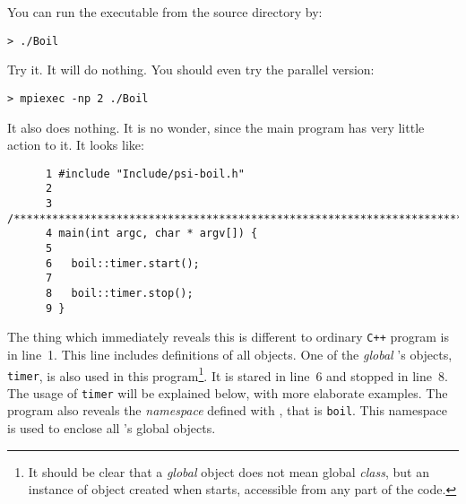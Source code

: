 You can run the executable from the source directory by:
%
\begin{verbatim}
> ./Boil
\end{verbatim} 
%
Try it. It will do nothing. You should even try the parallel version:
%
\begin{verbatim}
> mpiexec -np 2 ./Boil
\end{verbatim} 
%
It also does nothing. It is no wonder, since the main program has very little action
to it. It looks like:
%
{\small \begin{verbatim}
      1 #include "Include/psi-boil.h"
      2
      3 /****************************************************************************/
      4 main(int argc, char * argv[]) {
      5
      6   boil::timer.start();
      7
      8   boil::timer.stop();
      9 }
\end{verbatim}} 
%
The thing which immediately reveals this is different to ordinary {\tt C++} program 
is in line~1. This line includes definitions of all {\psiboil} objects. One of the
{\em global} {\psiboil}'s objects, {\tt timer}, is also used in this program\footnote
{It should be clear that a {\em global} {\psiboil} object does not mean global 
{\em class}, but an instance of object created when {\psiboil} starts, accessible 
from any part of the code.}.
It is stared in line~6 and stopped in line~8. The usage of {\tt timer} will be explained
below, with more elaborate examples. The program also reveals the {\em namespace}
defined with {\psiboil}, that is {\tt boil}. This namespace is used to enclose
all {\psiboil}'s global objects. 



